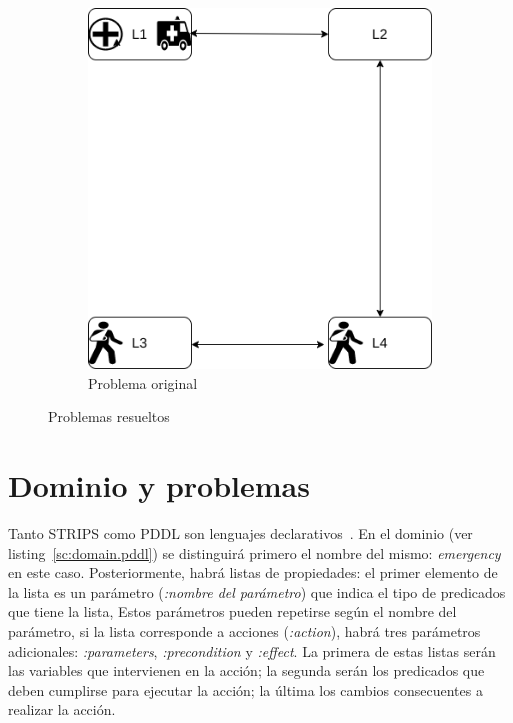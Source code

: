 \documentclass[a4paper,12pt,twocolumn]{article}
\begin{document}
\begin{figure}[!ht]
\begin{subfigure}[b]{0.45\textwidth}
         \includegraphics[width=\textwidth]{im/original}
         \caption{Problema original}
         \label{fig:original}
     \end{subfigure}
        \caption{Problemas resueltos}
        \label{fig:problemas}
\end{figure}

\section{Dominio y problemas}

Tanto STRIPS como PDDL son lenguajes declarativos~\citep{Dominguez2017}. En el dominio (ver listing~\ref{sc:domain.pddl}) se distinguirá primero el nombre del mismo: \emph{emergency} en este caso. Posteriormente, habrá listas de propiedades: el primer elemento de la lista es un parámetro (\emph{:nombre del parámetro}) que indica el tipo de predicados que tiene la lista, Estos parámetros pueden repetirse según el nombre del parámetro, si la lista corresponde a acciones (\emph{:action}), habrá tres parámetros adicionales: \emph{:parameters}, \emph{:precondition} y \emph{:effect}. La primera de estas listas serán las variables que intervienen en la acción; la segunda serán los predicados que deben cumplirse para ejecutar la acción; la última los cambios consecuentes a realizar la acción.
\end{document}
